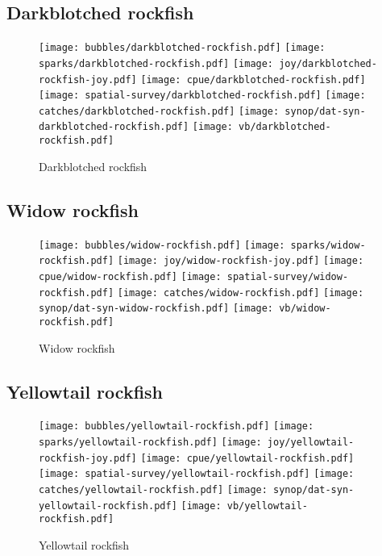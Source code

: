 \subsection*{Darkblotched rockfish}

\begin{figure}[htbp]
\centering
\texttt{[image: bubbles/darkblotched-rockfish.pdf]}
\texttt{[image: sparks/darkblotched-rockfish.pdf]}
\texttt{[image: joy/darkblotched-rockfish-joy.pdf]}
\texttt{[image: cpue/darkblotched-rockfish.pdf]}
\texttt{[image: spatial-survey/darkblotched-rockfish.pdf]}
\texttt{[image: catches/darkblotched-rockfish.pdf]}
\texttt{[image: synop/dat-syn-darkblotched-rockfish.pdf]}
\texttt{[image: vb/darkblotched-rockfish.pdf]}
\caption{Darkblotched rockfish}
\end{figure}
\clearpage
\subsection*{Widow rockfish}

\begin{figure}[htbp]
\centering
\texttt{[image: bubbles/widow-rockfish.pdf]}
\texttt{[image: sparks/widow-rockfish.pdf]}
\texttt{[image: joy/widow-rockfish-joy.pdf]}
\texttt{[image: cpue/widow-rockfish.pdf]}
\texttt{[image: spatial-survey/widow-rockfish.pdf]}
\texttt{[image: catches/widow-rockfish.pdf]}
\texttt{[image: synop/dat-syn-widow-rockfish.pdf]}
\texttt{[image: vb/widow-rockfish.pdf]}
\caption{Widow rockfish}
\end{figure}
\clearpage
\subsection*{Yellowtail rockfish}

\begin{figure}[htbp]
\centering
\texttt{[image: bubbles/yellowtail-rockfish.pdf]}
\texttt{[image: sparks/yellowtail-rockfish.pdf]}
\texttt{[image: joy/yellowtail-rockfish-joy.pdf]}
\texttt{[image: cpue/yellowtail-rockfish.pdf]}
\texttt{[image: spatial-survey/yellowtail-rockfish.pdf]}
\texttt{[image: catches/yellowtail-rockfish.pdf]}
\texttt{[image: synop/dat-syn-yellowtail-rockfish.pdf]}
\texttt{[image: vb/yellowtail-rockfish.pdf]}
\caption{Yellowtail rockfish}
\end{figure}
\clearpage
